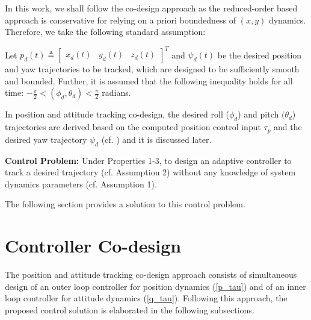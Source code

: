 In this work, we shall follow the co-design approach as the reduced-order based approach is conservative for relying on a priori boundedness of $(x,y)$ dynamics. Therefore, we take the following standard assumption:
\begin{assum}\label{assum_des}
Let $p_d (t) \triangleq
	\begin{bmatrix}
	x_d (t) & y_d (t) & z_d (t)
	\end{bmatrix}^T$ and $\psi _d(t) $ be the desired position and yaw trajectories to be tracked, which are designed to be sufficiently smooth and bounded. Further, it is assumed that the following inequality holds for all time: $ - \frac{\pi}{2} < (\phi_d, \theta_d) < \frac{\pi}{2}$ radians.
\end{assum}
\begin{remark}
In position and attitude tracking co-design, the desired roll ($\phi_d$) and pitch $(\theta_d$) trajectories are derived based on the computed position control input $\tau_p$ and the desired yaw trajectory $\psi_d$ (cf. \cite{mellinger2011minimum}) and it is discussed later.
\end{remark}
\textbf{Control Problem:} Under Properties 1-3, to design an adaptive controller to track a desired trajectory (cf. Assumption 2) without any knowledge of system dynamics parameters (cf. Assumption 1).

The following section provides a solution to this control problem.
\section{Controller Co-design}\label{sec:asmc_cont}
%
     The position and attitude tracking co-design approach consists of simultaneous design of an outer loop controller for position dynamics (\ref{p_tau}) and of an inner loop controller for attitude dynamics (\ref{q_tau}). Following this approach, the proposed control solution is elaborated in the following subsections. %
     
